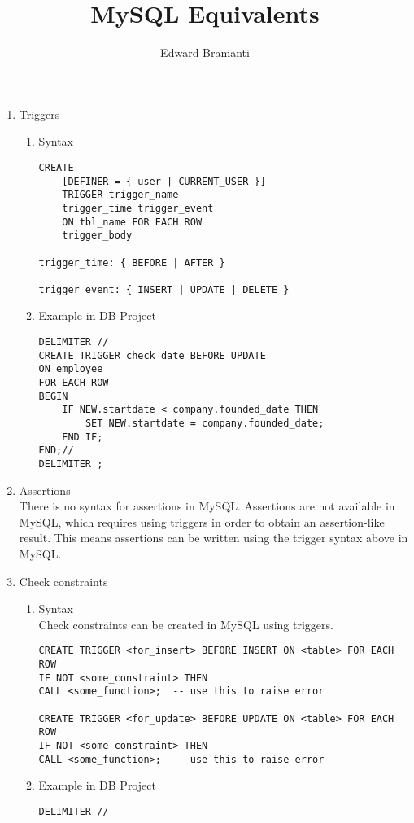 \documentclass{article}
\title{MySQL Equivalents}
\author{Edward Bramanti}
\begin{document}
\maketitle
\begin{enumerate}
    \item Triggers
    \begin{enumerate}
        \item Syntax
        \begin{verbatim}
CREATE
    [DEFINER = { user | CURRENT_USER }]
    TRIGGER trigger_name
    trigger_time trigger_event
    ON tbl_name FOR EACH ROW
    trigger_body

trigger_time: { BEFORE | AFTER }

trigger_event: { INSERT | UPDATE | DELETE }
        \end{verbatim}
        \item Example in DB Project
        \begin{verbatim}
DELIMITER //
CREATE TRIGGER check_date BEFORE UPDATE
ON employee
FOR EACH ROW
BEGIN
    IF NEW.startdate < company.founded_date THEN
        SET NEW.startdate = company.founded_date;
    END IF;
END;//
DELIMITER ;
        \end{verbatim}
    \end{enumerate}
    \item Assertions \\
        There is no syntax for assertions in MySQL. Assertions are not available in MySQL, which requires using triggers in order to obtain an assertion-like result. This means assertions can be written using the trigger syntax above in MySQL.
    \pagebreak
    \item Check constraints
    \begin{enumerate}
        \item Syntax \\
        Check constraints can be created in MySQL using triggers.
        \begin{verbatim}
CREATE TRIGGER <for_insert> BEFORE INSERT ON <table> FOR EACH ROW
IF NOT <some_constraint> THEN
CALL <some_function>;  -- use this to raise error

CREATE TRIGGER <for_update> BEFORE UPDATE ON <table> FOR EACH ROW
IF NOT <some_constraint> THEN
CALL <some_function>;  -- use this to raise error
        \end{verbatim}
        \item Example in DB Project
        \begin{verbatim}
DELIMITER //


\end{verbatim}
\end{enumerate}
\end{enumerate}
\end{document}
